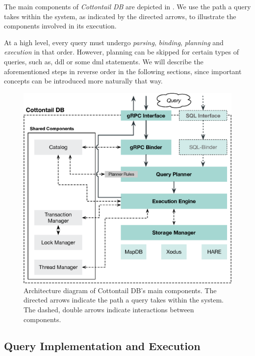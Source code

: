 The main components of \emph{Cottontail DB} are depicted in . We use the path a query takes within the system, as indicated by the directed arrows, to illustrate the components involved in its execution.

At a high level, every query must undergo \emph{parsing}, \emph{binding}, \emph{planning} and \emph{execution} in that order. However, planning can be skipped for certain types of queries, such as, \acrshort{ddl} or some \acrshort{dml} statements. We will describe the aforementioned steps in reverse order in the following sections, since important concepts can be introduced more naturally that way.

\begin{figure}[bt]
    \centering
    \includegraphics[width=\textwidth]{figures/architecture.eps}
    \caption{Architecture diagram of Cottontail DB's main components. The directed arrows indicate the path a query takes within the system. The dashed, double arrows indicate interactions between components.}
    \label{figure:cottontail_architecture}
\end{figure}


\subsection{Query Implementation and Execution}

